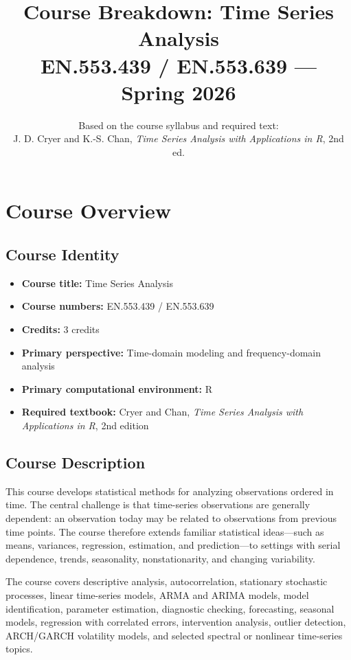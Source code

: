 \documentclass[11pt]{article}
\title{\textbf{Course Breakdown: Time Series Analysis}\\
\large EN.553.439 / EN.553.639 --- Spring 2026}
\author{Based on the course syllabus and required text:\\
J. D. Cryer and K.-S. Chan, \textit{Time Series Analysis with Applications in R}, 2nd ed.}
\date{}
\begin{document}
\maketitle

\section{Course Overview}

\subsection{Course Identity}

\begin{itemize}
    \item \textbf{Course title:} Time Series Analysis
    \item \textbf{Course numbers:} EN.553.439 / EN.553.639
    \item \textbf{Credits:} 3 credits
    \item \textbf{Primary perspective:} Time-domain modeling and frequency-domain analysis
    \item \textbf{Primary computational environment:} R
    \item \textbf{Required textbook:} Cryer and Chan, \textit{Time Series Analysis with Applications in R}, 2nd edition
\end{itemize}

\subsection{Course Description}

This course develops statistical methods for analyzing observations ordered in time.
The central challenge is that time-series observations are generally dependent:
an observation today may be related to observations from previous time points.
The course therefore extends familiar statistical ideas---such as means,
variances, regression, estimation, and prediction---to settings with serial
dependence, trends, seasonality, nonstationarity, and changing variability.

The course covers descriptive analysis, autocorrelation, stationary stochastic
processes, linear time-series models, ARMA and ARIMA models, model
identification, parameter estimation, diagnostic checking, forecasting,
seasonal models, regression with correlated errors, intervention analysis,
outlier detection, ARCH/GARCH volatility models, and selected spectral or
nonlinear time-series topics.
\end{document}
